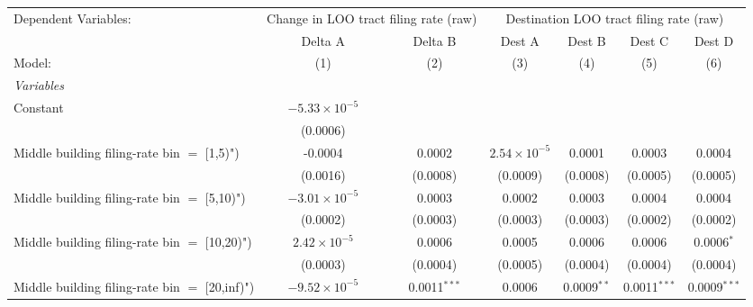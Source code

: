 \documentclass[
  11pt,
]{article}
\begin{document}
\begin{adjustbox}{max width=\textwidth}
\begingroup
\centering
\begin{tabular}{lcccccc}
   \tabularnewline \midrule \midrule
   Dependent Variables: & \multicolumn{2}{c}{Change in LOO tract filing rate (raw)} & \multicolumn{4}{c}{Destination LOO tract filing rate (raw)}\\
                                                  & Delta A                & Delta B        & Dest A                & Dest B         & Dest C         & Dest D \\   
   Model:                                         & (1)                    & (2)            & (3)                   & (4)            & (5)            & (6)\\  
   \midrule
   \emph{Variables}\\
   Constant                                       & $-5.33\times 10^{-5}$  &                &                       &                &                &   \\   
                                                  & (0.0006)               &                &                       &                &                &   \\   
   Middle building filing-rate bin $=$ [1,5)")    & -0.0004                & 0.0002         & $2.54\times 10^{-5}$  & 0.0001         & 0.0003         & 0.0004\\   
                                                  & (0.0016)               & (0.0008)       & (0.0009)              & (0.0008)       & (0.0005)       & (0.0005)\\   
   Middle building filing-rate bin $=$ [5,10)")   & $-3.01\times 10^{-5}$  & 0.0003         & 0.0002                & 0.0003         & 0.0004         & 0.0004\\   
                                                  & (0.0002)               & (0.0003)       & (0.0003)              & (0.0003)       & (0.0002)       & (0.0002)\\   
   Middle building filing-rate bin $=$ [10,20)")  & $2.42\times 10^{-5}$   & 0.0006         & 0.0005                & 0.0006         & 0.0006         & 0.0006$^{*}$\\   
                                                  & (0.0003)               & (0.0004)       & (0.0005)              & (0.0004)       & (0.0004)       & (0.0004)\\   
   Middle building filing-rate bin $=$ [20,inf)") & $-9.52\times 10^{-5}$  & 0.0011$^{***}$ & 0.0006                & 0.0009$^{**}$  & 0.0011$^{***}$ & 0.0009$^{***}$\\   

\end{tabular}
\end{adjustbox}
\end{document}
